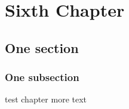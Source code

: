 \documentclass[../main.tex]{subfiles}
\begin{document}
\chapter{Sixth Chapter}

\lipsum[7]

\section{One section}

\lipsum[3]

\subsection{One subsection}

\lipsum[3]
test chapter more text
\end{document}
